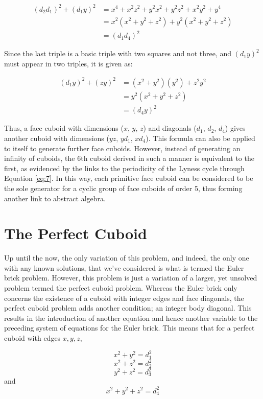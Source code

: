 \documentclass[11pt]{article}
\begin{document}
\begin{equation*}
\begin{aligned}
(d_2d_1)^2+(d_1y)^2&=x^4+x^2z^2+y^2x^2+y^2z^2+x^2y^2+y^4 \\
&=x^2(x^2+y^2+z^2)+y^2(x^2+y^2+z^2) \\
&=(d_1d_4)^2
\end{aligned}
\end{equation*}

Since the last triple is a basic triple with two squares and not three, and $(d_1y)^2$ must appear in two triples, it is given as:

\begin{equation*} 
\begin{aligned}
(d_1y)^2+(zy)^2&=(x^2+y^2)(y^2)+z^2y^2 \\
&=y^2(x^2+y^2+z^2) \\
&=(d_4y)^2
\end{aligned}
\end{equation*}

Thus, a face cuboid with dimensions ($x$, $y$, $z$) and diagonals ($d_1$, $d_2$, $d_4$) gives another cuboid with dimensions ($yz$, $yd_1$, $xd_4$). This formula can also be applied to itself to generate further face cuboids. However, instead of generating an infinity of cuboids, the 6th cuboid derived in such a manner is equivalent to the first, as evidenced by the links to the periodicity of the Lyness cycle through Equation \eqref{eq:7}. In this way, each primitive face cuboid can be considered to be the sole generator for a cyclic group of face cuboids of order 5, thus forming another link to abstract algebra.
\section{The Perfect Cuboid}
Up until the now, the only variation of this problem, and indeed, the only one with any known solutions, that we've considered is what is termed the Euler brick problem. However, this problem is just a variation of a larger, yet unsolved problem termed the perfect cuboid problem. 
Whereas the Euler brick only concerns the existence of a cuboid with integer edges and face diagonals, the perfect cuboid problem adds another condition; an integer body diagonal\cite{perfectcuboid}. This results in the introduction of another equation and hence another variable to the preceding system of equations for the Euler brick. This means that for a perfect cuboid with edges $x, y, z$,

$$x^2+y^2=d_1^2$$
$$x^2+z^2=d_2^2$$
$$y^2+z^2=d_3^2$$
and \\
$$x^2+y^2+z^2=d_4^2$$
\end{document}
